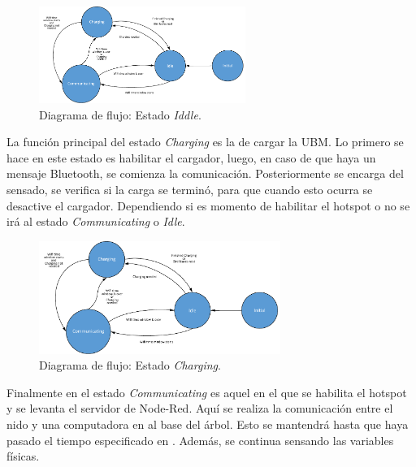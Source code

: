 \begin{figure}[H]
	\centering
	\includegraphics[width=0.6\textwidth, page=4]{ImagenesIngenieria de Detalle/FlowChart.pdf}	
	\caption{Diagrama de flujo: Estado \textit{Iddle}.}
	\label{fig:Diagrama_de_flujo_idle}
\end{figure}

La función principal del estado \textit{Charging} es la de cargar la UBM. Lo primero se hace en este estado es habilitar el cargador, luego, en caso de que haya un mensaje Bluetooth, se comienza la comunicación. Posteriormente se encarga del sensado, se verifica si la carga se terminó, para que cuando esto ocurra se desactive el cargador. Dependiendo si es momento de habilitar el hotspot o no se irá al estado \textit{Communicating} o \textit{Idle}.

\begin{figure}[H]
	\centering
	\includegraphics[width=0.7\textwidth, page=2]{ImagenesIngenieria de Detalle/FlowChart.pdf}
	\caption{Diagrama de flujo: Estado \textit{Charging}.}
	\label{fig:Diagrama_de_flujo_charging}
\end{figure}

Finalmente en el estado \textit{Communicating} es aquel en el que se habilita el hotspot y se levanta el servidor de Node-Red. Aquí se realiza la comunicación entre el nido y una computadora en al base del árbol. Esto se mantendrá hasta que haya pasado el tiempo especificado en . Además, se continua sensando las variables físicas.

